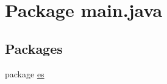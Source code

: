 \hypertarget{namespacemain_1_1java}{}\section{Package main.\+java}
\label{namespacemain_1_1java}
\subsection*{Packages}
\begin{DoxyCompactItemize}
\item 
package \hyperlink{namespacemain_1_1java_1_1es}{es}
\end{DoxyCompactItemize}
